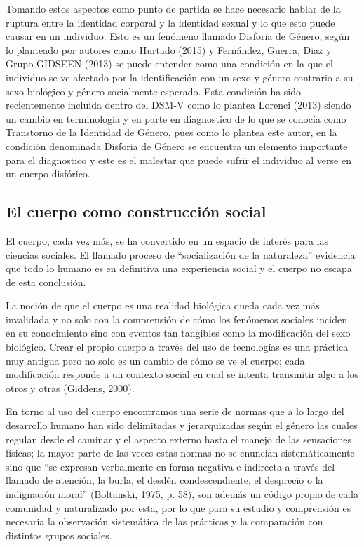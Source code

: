 Tomando estos aspectos como punto de partida se hace necesario hablar de la
ruptura entre la identidad corporal y la identidad sexual y lo que esto puede
causar en un individuo.
Esto es un fenómeno llamado Disforia de Género, según lo planteado por autores
como Hurtado (2015) y Fernández, Guerra, Diaz y Grupo GIDSEEN (2013) se puede
entender como una condición en la que el individuo se ve afectado por la
identificación con un sexo y género contrario a su sexo biológico y género
socialmente esperado.
Esta condición ha sido recientemente incluida dentro del DSM-V como lo plantea
Lorenci (2013) siendo un cambio en terminología y en parte en diagnostico de lo
que se conocía como Transtorno de la Identidad de Género, pues como lo plantea
este autor, en la condición denominada Disforia de Género se encuentra un
elemento importante para el diagnostico y este es el malestar que puede sufrir
el individuo al verse en un cuerpo disfórico.

\subsection{El cuerpo como construcción social}
El cuerpo, cada vez más, se ha convertido en un espacio de interés para las
ciencias sociales.
El llamado proceso de “socialización de la naturaleza” evidencia que todo lo
humano es en definitiva una experiencia social y el cuerpo no escapa de esta
conclusión.

La noción de que el cuerpo es una realidad biológica queda cada vez más
invalidada y no solo con la comprensión de cómo los fenómenos sociales inciden
en su conocimiento sino con eventos tan tangibles como la modificación del sexo
biológico.
Crear el propio cuerpo a través del uso de tecnologías es una práctica muy
antigua pero no solo es un cambio de cómo se ve el cuerpo;
cada modificación responde a un contexto social en cual se intenta transmitir
algo a los otros y otras (Giddens, 2000).

En torno al uso del cuerpo encontramos una serie de normas que a lo largo del
desarrollo humano han sido delimitadas y jerarquizadas según el género las
cuales regulan desde el caminar y el aspecto externo hasta el manejo de las
sensaciones físicas;
la mayor parte de las veces estas normas no se enuncian sistemáticamente sino
que “se expresan verbalmente en forma negativa e indirecta a través del
llamado de atención, la burla, el desdén condescendiente, el desprecio o la
indignación moral” (Boltanski, 1975, p. 58), son además un código propio de
cada comunidad y naturalizado por esta, por lo que para su estudio y comprensión
es necesaria la observación sistemática de las prácticas y la comparación con
distintos grupos sociales.

